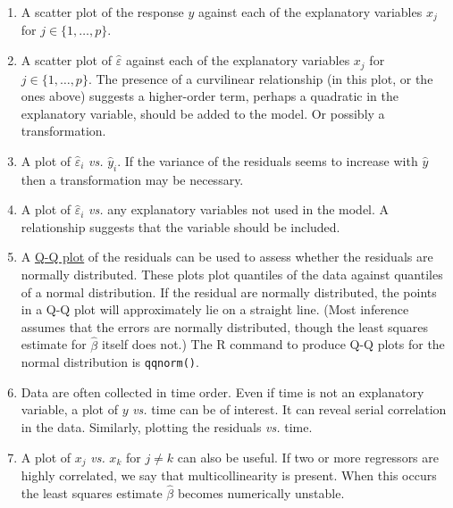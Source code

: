 \documentclass[
  a4paper,
]{article}
\theoremstyle{definition}
\theoremstyle{definition}
\theoremstyle{definition}
\theoremstyle{definition}
\theoremstyle{remark}
\begin{document}
\begin{enumerate}
\def\labelenumi{\arabic{enumi}.}
\item
  A scatter plot of the response \(y\) against each of the explanatory
  variables \(x_j\) for \(j \in \{1, \ldots, p\}\).
\item
  A scatter plot of \(\hat\varepsilon\) against each of the explanatory variables
  \(x_j\) for \(j \in \{1, \ldots, p\}\). The presence of a curvilinear
  relationship (in this plot, or the ones above) suggests a higher-order term,
  perhaps a quadratic in the explanatory variable, should be added to the
  model. Or possibly a transformation.
\item
  A plot of \(\hat\varepsilon_i\) \emph{vs.} \(\hat y_i\). If the variance of the residuals
  seems to increase with \(\hat y\) then a transformation may be necessary.
\item
  A plot of \(\hat\varepsilon_i\) \emph{vs.} any explanatory variables not
  used in the model. A relationship suggests that the variable should be
  included.
\item
  A \href{https://en.wikipedia.org/wiki/Q\%E2\%80\%93Q_plot}{Q-Q plot}
  of the residuals can be used to assess whether the residuals are normally
  distributed. These plots plot quantiles of the data against quantiles
  of a normal distribution. If the residual are normally distributed,
  the points in a Q-Q plot will approximately lie on a straight line.
  (Most inference assumes that the errors are normally distributed, though
  the least squares estimate for \(\hat\beta\) itself does not.) The R
  command to produce Q-Q plots for the normal distribution is \texttt{qqnorm()}.
\item
  Data are often collected in time order. Even if time is not an explanatory
  variable, a plot of \(y\) \emph{vs.} time can be of interest. It can reveal
  serial correlation in the data. Similarly, plotting the residuals \emph{vs.}
  time.
\item
  A plot of \(x_j\) \emph{vs.} \(x_k\) for \(j\neq k\) can also be useful.
  If two or more regressors are highly correlated, we say that
  multicollinearity is present. When this occurs the least squares estimate
  \(\hat\beta\) becomes numerically unstable.
\end{enumerate}
\end{document}
